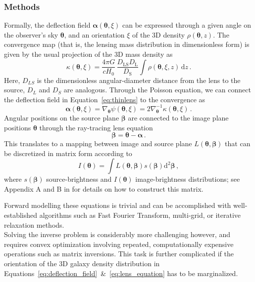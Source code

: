 \documentclass[a4paper,10pt]{article}
\begin{document}
\subsubsection{Methods}
\label{sec:orgdf4d372}
\label{sec:methods}
Formally, the deflection field \(\bm\alpha(\bm\theta, \xi)\) can be
expressed through a given angle on the observer's sky \(\bm\theta\), and
an orientation \(\xi\) of the 3D density \(\rho(\bm\theta,z)\). The
convergence map (that is, the lensing mass distribution in
dimensionless form) is given by the usual projection of the 3D mass
density as
\begin{equation}\label{eq:thinlens}%
  \kappa(\bm\theta,\xi) = \frac{4\pi G}{cH_0}\, \frac{D_\mathrm{LS}D_\mathrm{L}}{D_\mathrm{S}} \int \rho(\bm\theta,\xi,z)\,\mathrm{d}z \,.
\end{equation}
Here, \(D_{LS}\) is the dimensionless angular-diameter distance from the
lens to the source, \(D_L\) and \(D_S\) are analogous.  Through the
Poisson equation, we can connect the deflection field in
Equation~\eqref{eq:thinlens} to the convergence as
\begin{equation}\label{eq:deflection_field}%
  \bm\alpha(\bm\theta,\xi) = \nabla_{\bm\theta}\psi(\bm\theta,\xi) = 2\nabla_{\bm\theta}^{-1}\kappa(\bm\theta,\xi) \,.
\end{equation}
Angular positions on the source plane \(\bm\beta\) are connected to the
image plane positions \(\bm\theta\) through the ray-tracing lens
equation
\begin{equation}\label{eq:lens_equation}%
  \bm\beta = \bm\theta - \bm\alpha \,.
\end{equation}
This translates to a mapping between image and source plane
\(L(\bm\theta, \bm\beta)\) that can be discretized in matrix form
according to
\begin{equation}%
  I(\bm\theta) = \int L(\bm\theta, \bm\beta) s(\bm\beta) \mathrm{d^{2}}\bm\beta\,,
\end{equation}
where \(s(\bm\beta)\) source-brightness and \(I(\bm\theta)\)
image-brightness distributions; see Appendix A and B in
\cite{Treu2004} for details on how to construct this matrix.

Forward modelling these equations is trivial and can be accomplished
with well-established algorithms such as Fast Fourier Transform,
multi-grid, or iterative relaxation methods. \\[0pt]
Solving the inverse problem is considerably more challenging however,
and requires convex optimization involving repeated, computationally
expensive operations such as matrix inversions. This task is further
complicated if the orientation of the 3D galaxy density distribution
in
Equations~\eqref{eq:deflection_field}~\&~\eqref{eq:lens_equation}
has to be marginalized.
\end{document}
